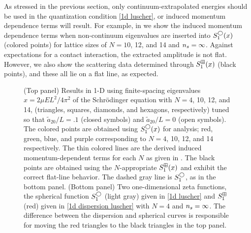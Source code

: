 As stressed in the previous section, only continuum-extrapolated energies should be used in the quantization condition \eqref{1d luscher}, or induced momentum dependence terms will result.
For example, in  we show the induced momentum dependence terms when non-continuum eigenvalues are inserted into $S^{\bigcirc}_1(x)$ (colored points) for lattice sizes of $N=10$, 12, and 14 and ${n_s}=\infty$.
Against expectations for a contact interaction, the extracted amplitude is not flat.
However, we also show the scattering data determined through $S^{\boxplus}_1(x)$ (black points), and these all lie on a flat line, as expected.

\begin{figure}
\center
    \center
    
    \caption{
        (Top panel)
        Results in 1-D using finite-spacing eigenvalues $x=2\mu EL^2/4\pi^2$ of the Schr\"odinger equation with $N=4$, 10, 12, and 14, (triangles, squares, diamonds, and hexagons, respectively) tuned so that $\tilde a_{20}/L=.1$ (closed symbols) and $\tilde a_{20}/L=0$ (open symbols).
        The colored points are obtained using $S^\bigcirc_1(x)$ for analysis; red, green, blue, and purple corresponding to $N=4$, 10, 12, and 14 respectively.
        The thin colored lines are the derived induced momentum-dependent terms for each $N$ as given in .
        The black points are obtained using the $N$-appropriate $S^{\boxplus}_1(x)$ and exhibit the correct flat-line behavior.
        The dashed gray line is $S_1^\bigcirc$, as in the bottom panel.
        (Bottom panel)
        Two one-dimensional zeta functions, the spherical function $S_1^{\bigcirc}$ (light gray) given in \eqref{1d luscher} and $S_1^{\boxplus}$ (red) given in \eqref{1d dispersion luscher} with $N=4$ and ${n_s}=\infty$.
        The difference between the dispersion and spherical curves is responsible for moving the red triangles to the black triangles in the top panel.
        }
        \label{fig:luescher1d}
\end{figure}

